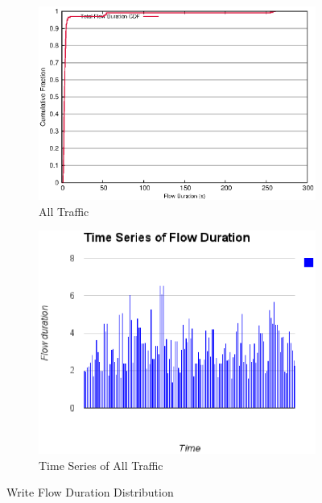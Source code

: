 \begin{figure}[!htbp]
\begin{subfigure}[b]{.45\linewidth}
	\includegraphics[width=.99\textwidth]{figures/6writes/flow_duration.eps}
	\caption{All Traffic}\label{fig:write_duration:all}
   \end{subfigure}%
  \begin{subfigure}[b]{.45\linewidth}
   \centering
	\includegraphics[width=.99\textwidth]{figures/6writes/flow_duration_time_series.eps}
	\caption{Time Series of All Traffic}\label{fig:write:time_series}
   \end{subfigure}%
\caption{Write Flow Duration Distribution}
\end{figure}

